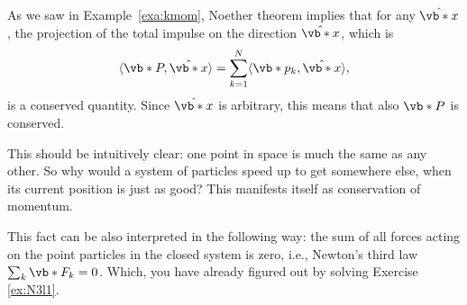\documentclass[english,fontsize=11pt,paper=b5]{scrbook}
\theoremstyle{definition}
\begin{document}
    As we saw in Example~\ref{exa:kmom}, Noether theorem implies that for any $\hat{\vb*{x}}$, the projection of the total impulse on the direction $\hat{\vb*{x}}$, which is
    \begin{equation}
      \langle\vb*{P}, \hat{\vb*{x}}\rangle = \sum_{k=1}^N \langle \vb*{p}_k, \hat{\vb*{x}}\rangle,
    \end{equation}
    is a conserved quantity.
    Since $\hat{\vb*{x}}$ is arbitrary, this means that also $\vb*{P}$ is conserved.

    This should be intuitively clear: one point in space is much the same as any other. So why would a system of particles speed up to get somewhere else, when its current position is just as good? This manifests itself as conservation of momentum.

    This fact can be also interpreted in the following way: the sum of all forces acting on the point particles in the closed system is zero, i.e., Newton's third law $\sum_k \vb*{F}_k = 0$. Which, you have already figured out by solving Exercise \ref{ex:N3l1}.
\end{document}
